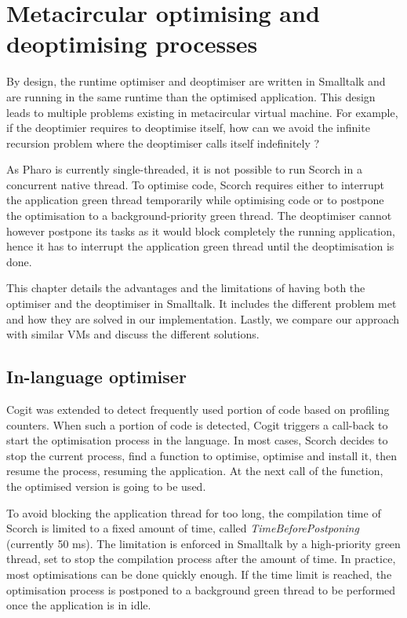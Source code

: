 \documentclass[a4paper,12pt,twoside]{../includes/ThesisStyle}
\begin{document}
\fi

\chapter{Metacircular optimising and deoptimising processes}
\label{chap:metacircular}
\minitoc

By design, the runtime optimiser and deoptimiser are written in Smalltalk and are running in the same runtime than the optimised application. This design leads to multiple problems existing in metacircular virtual machine. For example, if the deoptimier requires to deoptimise itself, how can we avoid the infinite recursion problem where the deoptimiser calls itself indefinitely ?

As Pharo is currently single-threaded, it is not possible to run Scorch in a concurrent native thread. To optimise code, Scorch requires either to interrupt the application green thread temporarily while optimising code or to postpone the optimisation to a background-priority green thread. The deoptimiser cannot however postpone its tasks as it would block completely the running application, hence it has to interrupt the application green thread until the deoptimisation is done.

This chapter details the advantages and the limitations of having both the optimiser and the deoptimiser in Smalltalk. It includes the different problem met and how they are solved in our implementation. Lastly, we compare our approach with similar VMs and discuss the different solutions. 


\section{In-language optimiser}

Cogit was extended to detect frequently used portion of code based on profiling counters. When such a portion of code is detected, Cogit triggers a call-back to start the optimisation process in the language. In most cases, Scorch decides to stop the current process, find a function to optimise, optimise and install it, then resume the process, resuming the application. At the next call of the function, the optimised version is going to be used. 

To avoid blocking the application thread for too long, the compilation time of Scorch is limited to a fixed amount of time, called \emph{TimeBeforePostponing} (currently 50 ms). The limitation is enforced in Smalltalk by a high-priority green thread, set to stop the compilation process after the amount of time. In practice, most optimisations can be done quickly enough. If the time limit is reached, the optimisation process is postponed to a background green thread to be performed once the application is in idle.
\end{document}
